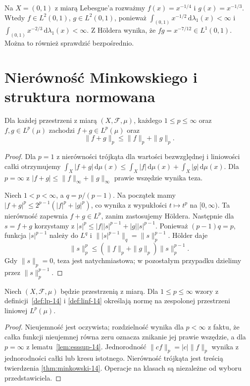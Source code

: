 \begin{przyklad}
Na $X=(0,1)$ z miarą Lebesgue'a rozważmy
$f(x)=x^{-1/4}$ i $g(x)=x^{-1/3}$.
Wtedy $f\in L^2(0,1)$, $g\in L^2(0,1)$,
ponieważ $\int_{(0,1)}x^{-1/2}\,\mathrm d\lambda_1(x)<\infty$
i $\int_{(0,1)}x^{-2/3}\,\mathrm d\lambda_1(x)<\infty$.
Z Höldera wynika, że $fg=x^{-7/12}\in L^1(0,1)$.
Można to również sprawdzić bezpośrednio.
\end{przyklad}

\section{Nierówność Minkowskiego i struktura normowana}
\begin{twierdzenie}[Minkowski]
\label{thm:minkowski-14}
Dla każdej przestrzeni z miarą $(X,\mathcal F,\mu)$,
każdego $1\le p\le\infty$ oraz $f,g\in L^p(\mu)$
zachodzi $f+g\in L^p(\mu)$ oraz
\begin{equation}\label{eq:minkowski-14}
\|f+g\|_p\le\|f\|_p+\|g\|_p.
\end{equation}
\end{twierdzenie}
\begin{proof}
Dla $p=1$ z nierówności trójkąta dla wartości
bezwzględnej i liniowości całki otrzymujemy
$\int_X|f+g|\,\mathrm d\mu(x)\le\int_X|f|\,\mathrm d\mu(x)+
\int_X|g|\,\mathrm d\mu(x)$.
Dla $p=\infty$ z
$|f+g|\le\|f\|_\infty+\|g\|_\infty$ prawie wszędzie
wynika teza.

Niech $1<p<\infty$, a $q=p/(p-1)$.
Na początek mamy
$|f+g|^p\le 2^{p-1}(|f|^p+|g|^p)$,
co wynika z wypukłości $t\mapsto t^p$ na $[0,\infty)$.
Ta nierówność zapewnia $f+g\in L^p$, zanim zastosujemy Höldera.
Następnie dla $s=f+g$ korzystamy z
$|s|^p\le |f||s|^{p-1}+|g||s|^{p-1}$.
Ponieważ $(p-1)q=p$, funkcja $|s|^{p-1}$ należy
do $L^q$ i $\||s|^{p-1}\|_q=\|s\|_p^{p-1}$.
Hölder daje
\[
\|s\|_p^p
\le(\|f\|_p+\|g\|_p)\|s\|_p^{p-1}.
\]
Gdy $\|s\|_p=0$, teza jest natychmiastowa;
w pozostałym przypadku dzielimy przez $\|s\|_p^{p-1}$.
\end{proof}

\begin{wniosek}
\label{cor:lp-normed-14}
Niech $(X,\mathcal F,\mu)$ będzie przestrzenią z miarą.
Dla $1\le p\le\infty$ wzory z
definicji~\ref{def:lp-14} i \ref{def:linf-14}
określają normę na zespolonej przestrzeni liniowej $L^p(\mu)$.
\end{wniosek}
\begin{proof}
Nieujemność jest oczywista; rozdzielność wynika
dla $p<\infty$ z faktu, że całka funkcji nieujemnej
równa zeru oznacza znikanie jej prawie wszędzie,
a dla $p=\infty$ z lematu~\ref{lem:esssup-14}.
Jednorodność $\|cf\|_p=|c|\|f\|_p$ wynika
z jednorodności całki lub kresu istotnego.
Nierówność trójkąta jest treścią twierdzenia
\ref{thm:minkowski-14}. Operacje na klasach
są niezależne od wyboru przedstawiciela.
\end{proof}

